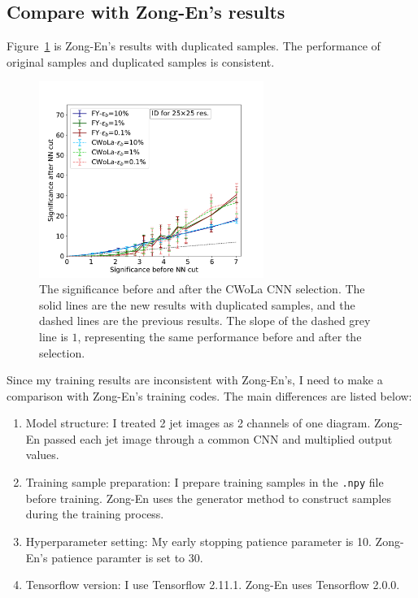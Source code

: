 \documentclass[12pt]{article}
\begin{document}
	\subsection{Compare with Zong-En's results}%
	\label{sub:compare_with_zong_en_s_results}
		Figure~\ref{fig:sensitivity_improvement_bkg_eff_copy_1_ZN_testing} is Zong-En's results with duplicated samples. The performance of original samples and duplicated samples is consistent.
		\begin{figure}[htpb]
			\centering
			\includegraphics[width=0.65\textwidth]{HVmodel_sensitivity_improvement_bkg_eff_copy_1_ZN_testing.pdf}
			\caption{The significance before and after the CWoLa CNN selection. The solid lines are the new results with duplicated samples, and the dashed lines are the previous results. The slope of the dashed grey line is $1$, representing the same performance before and after the selection.}
			\label{fig:sensitivity_improvement_bkg_eff_copy_1_ZN_testing}
		\end{figure}

		Since my training results are inconsistent with Zong-En's, I need to make a comparison with Zong-En's training codes. The main differences are listed below:
		\begin{enumerate}
			\item Model structure: I treated 2 jet images as 2 channels of one diagram. Zong-En passed each jet image through a common CNN and multiplied output values.
			\item Training sample preparation: I prepare training samples in the \verb|.npy| file before training. Zong-En uses the generator method to construct samples during the training process.
			\item Hyperparameter setting: My early stopping patience parameter is 10. Zong-En's patience paramter is set to 30.
			\item Tensorflow version: I use Tensorflow 2.11.1. Zong-En uses Tensorflow 2.0.0.
		\end{enumerate}
\end{document}
